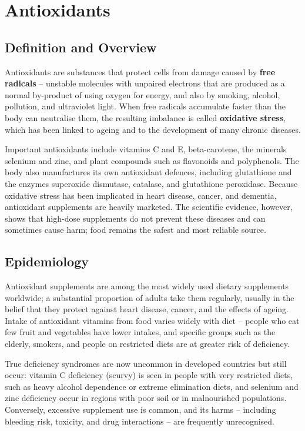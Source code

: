 \chapter{Antioxidants}

\section*{Definition and Overview}
Antioxidants are substances that protect cells from damage caused by \textbf{free radicals} -- unstable molecules with unpaired electrons that are produced as a normal by-product of using oxygen for energy, and also by smoking, alcohol, pollution, and ultraviolet light. When free radicals accumulate faster than the body can neutralise them, the resulting imbalance is called \textbf{oxidative stress}, which has been linked to ageing and to the development of many chronic diseases.

Important antioxidants include vitamins C and E, beta-carotene, the minerals selenium and zinc, and plant compounds such as flavonoids and polyphenols. The body also manufactures its own antioxidant defences, including glutathione and the enzymes superoxide dismutase, catalase, and glutathione peroxidase. Because oxidative stress has been implicated in heart disease, cancer, and dementia, antioxidant supplements are heavily marketed. The scientific evidence, however, shows that high-dose supplements do not prevent these diseases and can sometimes cause harm; food remains the safest and most reliable source.

\section*{Epidemiology}
Antioxidant supplements are among the most widely used dietary supplements worldwide; a substantial proportion of adults take them regularly, usually in the belief that they protect against heart disease, cancer, and the effects of ageing. Intake of antioxidant vitamins from food varies widely with diet -- people who eat few fruit and vegetables have lower intakes, and specific groups such as the elderly, smokers, and people on restricted diets are at greater risk of deficiency.

True deficiency syndromes are now uncommon in developed countries but still occur: vitamin C deficiency (scurvy) is seen in people with very restricted diets, such as heavy alcohol dependence or extreme elimination diets, and selenium and zinc deficiency occur in regions with poor soil or in malnourished populations. Conversely, excessive supplement use is common, and its harms -- including bleeding risk, toxicity, and drug interactions -- are frequently unrecognised.

